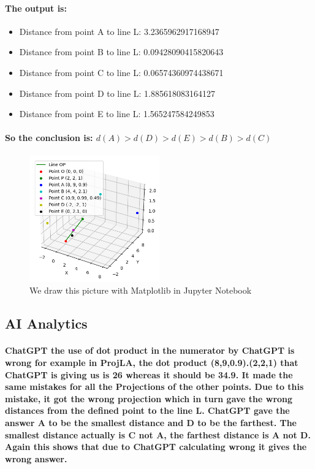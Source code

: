 \documentclass[11pt]{article} %
\begin{document}
\paragraph{The output is: }
\begin{itemize}
    \item Distance from point A to line L: 3.2365962917168947
    \item Distance from point B to line L: 0.09428090415820643
    \item Distance from point C to line L: 0.06574360974438671
    \item Distance from point D to line L: 1.885618083164127
    \item Distance from point E to line L: 1.565247584249853
\end{itemize}

\paragraph{\textbf{So the conclusion is: $d(A)>d(D)>d(E)>d(B)>d(C)$}}


% 
\begin{figure}[H]
    \centering
    \includegraphics[width=0.5\textwidth]{pic/DrawPlot.png}
    \caption{We draw this picture with Matplotlib in Jupyter Notebook}
\end{figure}
% 
% 
% 
\subsection{AI Analytics}
\paragraph{\textbf{ChatGPT} the use of dot product in the numerator by ChatGPT is wrong for example in 
ProjLA, the dot product (8,9,0.9).(2,2,1) that ChatGPT is giving us is 26 whereas it should 
be 34.9. It made the same mistakes for all the Projections of the other points. Due to this 
mistake, it got the wrong projection which in turn gave the wrong distances from the defined 
point to the line L. ChatGPT gave the answer A to be the smallest distance and D to be 
the farthest. The smallest distance actually is C not A, the farthest distance is A not D.
Again this shows that due to ChatGPT calculating wrong it gives the wrong answer.}
\end{document}
